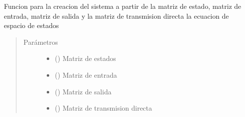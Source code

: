 \documentclass[letterpaper,10pt,spanish]{sphinxmanual}
\begin{document}

\begin{fulllineitems}
\label{\detokenize{codigos/rutinas_simulacion:rutinas_simulacion.system_creator_ss}}
Funcion para la creacion del sistema a partir de la matriz de estado, matriz de entrada, matriz de salida y la matriz de transmision directa la ecuacion de espacio de estados
\begin{quote}\begin{description}
\item[{Parámetros}] \leavevmode\begin{itemize}
\item {} 
 () \textendash{} Matriz de estados

\item {} 
 () \textendash{} Matriz de entrada

\item {} 
 () \textendash{} Matriz de salida

\item {} 
 () \textendash{} Matriz de transmision directa

\end{itemize}

\end{description}\end{quote}

\end{fulllineitems}

\end{document}
